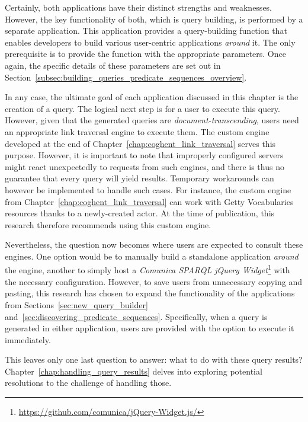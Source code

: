 Certainly, both applications have their distinct strengths and weaknesses. However, the key functionality of both, which is query building, is performed by a separate application. This application provides a query-building function that enables developers to build various user-centric applications \textit{around} it. The only prerequisite is to provide the function with the appropriate parameters. Once again, the specific details of these parameters are set out in Section~\ref{subsec:building_queries_predicate_sequences_overview}.

In any case, the ultimate goal of each application discussed in this chapter is the creation of a query. The logical next step is for a user to execute this query. However, given that the generated queries are \textit{document-transcending}, users need an appropriate link traversal engine to execute them. The custom engine developed at the end of Chapter~\ref{chap:coghent_link_traversal} serves this purpose. However, it is important to note that improperly configured servers might react unexpectedly to requests from such engines, and there is thus no guarantee that every query will yield results. Temporary workarounds can however be implemented to handle such cases. For instance, the custom engine from Chapter~\ref{chap:coghent_link_traversal} can work with Getty Vocabularies resources thanks to a newly-created actor. At the time of publication, this research therefore recommends using this custom engine. 

Nevertheless, the question now becomes where users are expected to consult these engines. One option would be to manually build a standalone application \textit{around} the engine, another to simply host a \textit{Comunica SPARQL jQuery Widget}\footnote{\url{https://github.com/comunica/jQuery-Widget.js/}} with the necessary configuration. However, to save users from unnecessary copying and pasting, this research has chosen to expand the functionality of the applications from Sections~\ref{sec:new_query_builder} and~\ref{sec:discovering_predicate_sequences}. Specifically, when a query is generated in either application, users are provided with the option to execute it immediately.

This leaves only one last question to answer: what to do with these query results? Chapter~\ref{chap:handling_query_results} delves into exploring potential resolutions to the challenge of handling those.